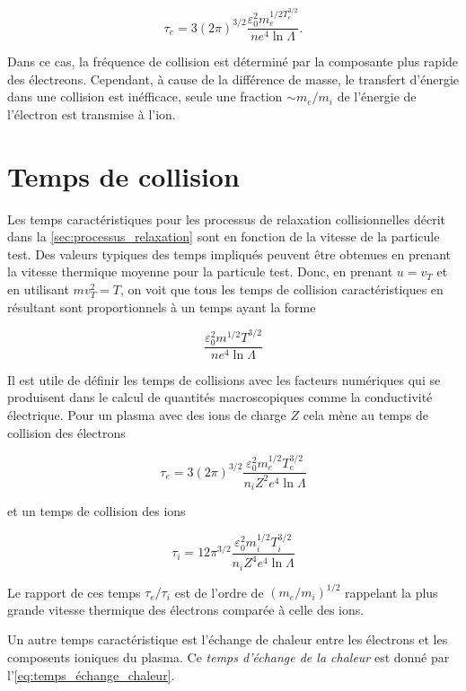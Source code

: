 \documentclass[main.tex]{subfiles}
\begin{document}
\[
	\tau_e = 3\left( 2 \pi\right)^{3/2} \frac{\varepsilon_0^2 m_e^{1/2 T_e^{3/2}}}{ne^4 \ln \Lambda}.
\]
 
\noindent Dans ce cas, la fréquence de collision est déterminé par la composante plus rapide des électreons.
Cependant, à cause de la différence de masse, le transfert d'énergie dans une collision est inéfficace, seule une fraction \( \sim m_e/m_i \) de l'énergie de l'électron est transmise à l'ion. 

\FloatBarrier
\section{Temps de collision}
\label{sec:temps_collision}
 
Les temps caractéristiques pour les processus de relaxation collisionnelles décrit dans la \autoref{sec:processus_relaxation} sont en fonction de la vitesse de la particule test.
Des valeurs typiques des temps impliqués peuvent être obtenues en prenant la vitesse thermique moyenne pour la particule test.
Donc, en prenant \( u = v_T \) et en utilisant \( m v_T^2 = T \), on voit que tous les temps de collision caractéristiques en résultant sont proportionnels à un temps ayant la forme

\[
	\frac{\varepsilon_0^2 m^{1/2}  T^{3/2}}{ne^4\ln \Lambda}
\]

Il est utile de définir les temps de collisions avec les facteurs numériques qui se produisent dans le calcul de quantités macroscopiques comme la conductivité électrique.
Pour un plasma avec des ions de charge \( Z \) cela mène au temps de collision des électrons

\begin{equation}
	\tau_e = 3 \left( 2 \pi \right)^{3/2} \frac{\varepsilon_0^2 m_e^{1/2}  T_e^{3/2}}{n_i Z^2e^4\ln \Lambda}
	\label{eq:temps_collision_electron}
\end{equation}

\noindent et un temps de collision des ions

\begin{equation}
	\tau_i = 12 \pi^{3/2} \frac{\varepsilon_0^2 m_i^{1/2}  T_i^{3/2}}{n_i Z^4e^4\ln \Lambda}
	\label{eq:temps_collision_ion}
\end{equation}

\noindent Le rapport de ces temps \( \tau_e/\tau_i \) est de l'ordre de \( \left( m_e / m_i \right)^{1/2} \) rappelant la plus grande vitesse thermique des électrons comparée à celle des ions.

Un autre temps caractéristique est l'échange de chaleur entre les électrons et les composents ioniques du plasma.
Ce \textit{temps d'échange de la chaleur} est donné par l'\autoref{eq:temps_échange_chaleur}.
\end{document}
